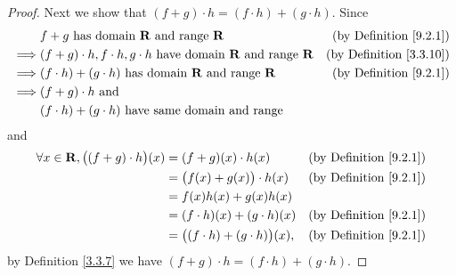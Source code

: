 \begin{proof}
    Next we show that \((f + g) \cdot h = (f \cdot h) + (g \cdot h)\).
    Since
    \begin{align*}
                 & f + g \text{ has domain } \mathbf{R} \text{ and range } \mathbf{R}                                   & \text{(by Definition \ref{9.2.1})}  \\
        \implies & (f + g) \cdot h, f \cdot h, g \cdot h  \text{ have domain } \mathbf{R} \text{ and range } \mathbf{R} & \text{(by Definition \ref{3.3.10})} \\
        \implies & (f \cdot h) + (g \cdot h)  \text{ has domain } \mathbf{R} \text{ and range } \mathbf{R}              & \text{(by Definition \ref{9.2.1})}  \\
        \implies & (f + g) \cdot h \text{ and }                                                                                                               \\
                 & (f \cdot h) + (g \cdot h) \text{ have same domain and range}
    \end{align*}
    and
    \begin{align*}
        \forall x \in \mathbf{R}, \big((f + g) \cdot h\big)(x) & = (f + g)(x) \cdot h(x)                   & \text{(by Definition \ref{9.2.1})} \\
                                                               & = \big(f(x) + g(x)\big) \cdot h(x)        & \text{(by Definition \ref{9.2.1})} \\
                                                               & = f(x)h(x) + g(x)h(x)                                                          \\
                                                               & = (f \cdot h)(x) + (g \cdot h)(x)         & \text{(by Definition \ref{9.2.1})} \\
                                                               & = \big((f \cdot h) + (g \cdot h)\big)(x), & \text{(by Definition \ref{9.2.1})}
    \end{align*}
    by Definition \ref{3.3.7} we have \((f + g) \cdot h = (f \cdot h) + (g \cdot h)\).


\end{proof}
